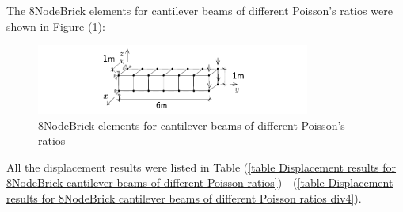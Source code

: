 \documentclass[fleqn,11pt]{article}
\begin{document}
The 8NodeBrick elements for cantilever beams of different Poisson's ratios were shown in Figure (\ref{fig 8NodeBrick elements for cantilever beams of different Poisson's ratios}):
\begin{figure}[H]
  \centering
  \includegraphics[width=9cm]{../Figure-files/beam_8brick_6div.pdf}
  \caption{8NodeBrick elements for cantilever beams of different Poisson's ratios}
  \label{fig 8NodeBrick elements for cantilever beams of different Poisson's ratios}
\end{figure}


All the displacement results were listed in Table (\ref{table Displacement results for 8NodeBrick cantilever beams of different Poisson ratios}) - (\ref{table Displacement results for 8NodeBrick cantilever beams of different Poisson ratios div4}). 
\end{document}
